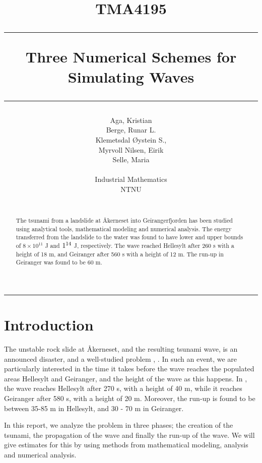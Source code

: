 \documentclass[11pt]{article}
\author{Aga, Kristian \\ Berge, Runar L. \\ Klemetsdal Øystein S.,\\
	Myrvoll Nilsen, Eirik \\ Selle, Maria\\\\
	Industrial Mathematics\\
	NTNU \\\\
}
\title{
TMA4195 \\ \vspace{5pt}
\hrule \vspace{10pt}
       {\Huge \textbf{Three Numerical Schemes for Simulating Waves}}
\vspace{10pt}\hrule\vspace{1cm}
}
\begin{document}
\maketitle
\vspace{1cm}
\hrule
\vspace{0.5cm}
\begin{abstract}
%	
	The tsunami from a landslide at Åkerneset into Geirangerfjorden has been studied using analytical tools, mathematical modeling and
	numerical analysis. The energy transferred from the landslide to the water was found to have lower and upper bounds of $8\times 10^{11}$ J and $1 \time 10^{14}$ J,
	respectively. The wave reached Hellesylt after 260 s with a height of 18 m, and Geiranger after 560 s with a height of 12 m. The run-up in Geiranger was found to
	be 60 m.
\end{abstract}
\thispagestyle{empty}
\clearpage
\tableofcontents
\thispagestyle{empty}
\clearpage
\setcounter{page}{1}
%
%
\section{Introduction}
The unstable rock slide at Åkerneset, and the resulting tsunami wave, is an announced disaster, and a well-studied problem \citep{harbitz14}, \citep{lothe10}. In such an event, we are particularly interested in the time it
takes before the wave reaches the populated areas Hellesylt and Geiranger, and the height of the wave as this happens. In \cite{harbitz14}, the wave reaches Hellesylt after 270 s,
with a height of 40 m, while it reaches Geiranger after 580 s, with a height of 20 m. Moreover, the run-up is found to be between 35-85 m in Hellesylt, and 30 - 70 m in Geiranger.

In this report, we analyze the problem in three phases; the creation of the tsunami, the propagation of the wave and finally the run-up of the wave.
We will give estimates for this by using methods from mathematical modeling, analysis and numerical analysis.
\end{document}
